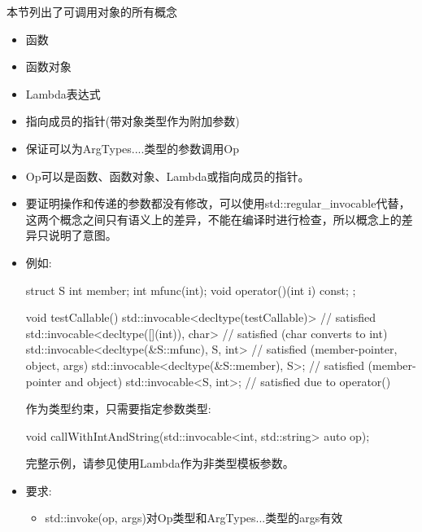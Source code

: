 
本节列出了可调用对象的所有概念

\begin{itemize}
\item
函数

\item
函数对象

\item
Lambda表达式

\item
指向成员的指针(带对象类型作为附加参数)
\end{itemize}



\begin{itemize}
\item
保证可以为ArgTypes....类型的参数调用Op

\item
Op可以是函数、函数对象、Lambda或指向成员的指针。

\item
要证明操作和传递的参数都没有修改，可以使用std::regular\_invocable代替，这两个概念之间只有语义上的差异，不能在编译时进行检查，所以概念上的差异只说明了意图。

\item
例如:

\begin{cpp}
struct S {
	int member;
	int mfunc(int);
	void operator()(int i) const;
};

void testCallable()
{
	std::invocable<decltype(testCallable)> // satisfied
	std::invocable<decltype([](int){}), char> // satisfied (char converts to int)
	std::invocable<decltype(&S::mfunc), S, int> // satisfied (member-pointer, object, args)
	std::invocable<decltype(&S::member), S>; // satisfied (member-pointer and object)
	std::invocable<S, int>; // satisfied due to operator()
}
\end{cpp}

作为类型约束，只需要指定参数类型:

\begin{cpp}
void callWithIntAndString(std::invocable<int, std::string> auto op);
\end{cpp}

完整示例，请参见使用Lambda作为非类型模板参数。

\item
要求:
\begin{itemize}
\item
std::invoke(op, args)对Op类型和ArgTypes...类型的args有效
\end{itemize}
\end{itemize}

